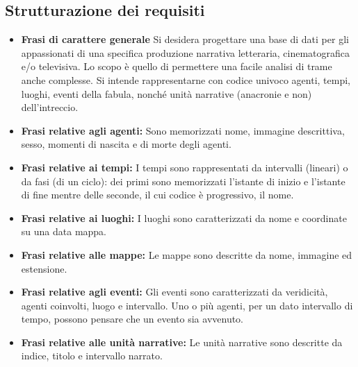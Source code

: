 \documentclass{article}
\begin{document}
\subsection{Strutturazione dei requisiti}

\begin{itemize}
	\item \textbf{Frasi di carattere generale}
	      Si desidera progettare una base di dati per gli appassionati di una
	      specifica produzione narrativa letteraria, cinematografica e/o
	      televisiva. Lo scopo è quello di permettere una facile analisi di trame
	      anche complesse. Si intende rappresentarne con codice univoco agenti,
	      tempi, luoghi, eventi della fabula, nonché unità narrative (anacronie e
	      non) dell'intreccio.
	\item \textbf{Frasi relative agli agenti:}
	      Sono memorizzati nome, immagine descrittiva, sesso, momenti di nascita e
	      di morte degli agenti.
	\item \textbf{Frasi relative ai tempi:}
	      I tempi sono rappresentati da intervalli (lineari) o da fasi (di un
	      ciclo): dei primi sono memorizzati l'istante di inizio e l'istante di
	      fine mentre delle seconde, il cui codice è progressivo, il nome.
	\item \textbf{Frasi relative ai luoghi:}
	      I luoghi sono caratterizzati da nome e coordinate su una data mappa.
	\item \textbf{Frasi relative alle mappe:}
	      Le mappe sono descritte da nome, immagine ed estensione.
	\item \textbf{Frasi relative agli eventi:}
	      Gli eventi sono caratterizzati da veridicità, agenti coinvolti, luogo e
	      intervallo. Uno o più agenti, per un dato intervallo di tempo, possono
	      pensare che un evento sia avvenuto.
	\item \textbf{Frasi relative alle unità narrative:}
	      Le unità narrative sono descritte da indice, titolo e intervallo
	      narrato.
\end{itemize}
\end{document}
